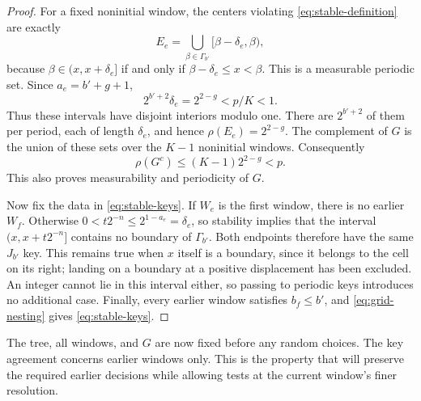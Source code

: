 \begin{proof}
For a fixed noninitial window, the centers violating
\eqref{eq:stable-definition} are exactly
\[
 E_e=\bigcup_{\beta\in\Gamma_{b'}}[\beta-\delta_e,\beta),
\]
because $\beta\in(x,x+\delta_e]$ if and only if
$\beta-\delta_e\le x<\beta$.  This is a measurable periodic set.
Since $a_e=b'+g+1$,
\[
 2^{b'+2}\delta_e=2^{2-g}<p/K<1.
\]
Thus these intervals have disjoint interiors modulo one.  There are
$2^{b'+2}$ of them per period, each of length $\delta_e$, and hence
$\rho(E_e)=2^{2-g}$.  The complement of $G$ is the union of these sets
over the $K-1$ noninitial windows.  Consequently
\[
 \rho(G^c)\le(K-1)2^{2-g}<p.
\]
This also proves measurability and periodicity of $G$.

Now fix the data in \eqref{eq:stable-keys}.  If $W_e$ is the first
window, there is no earlier $W_f$.  Otherwise
$0<t2^{-n}\le2^{1-a_e}=\delta_e$, so stability implies that the
interval $(x,x+t2^{-n}]$ contains no boundary of $\Gamma_{b'}$.
Both endpoints therefore have the same $J_{b'}$ key.  This remains true
when $x$ itself is a boundary, since it belongs to the cell on its
right; landing on a boundary at a positive displacement has been
excluded.  An integer cannot lie in this interval either, so passing
to periodic keys introduces no additional case.  Finally, every earlier
window satisfies $b_f\le b'$, and \eqref{eq:grid-nesting} gives
\eqref{eq:stable-keys}.
\end{proof}

The tree, all windows, and $G$ are now fixed before any random choices.
The key agreement concerns earlier windows only.  This is the property
that will preserve the required earlier decisions while allowing tests
at the current window's finer resolution.
